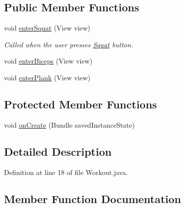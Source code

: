 \subsection*{Public Member Functions}
\begin{DoxyCompactItemize}
\item 
void \mbox{\hyperlink{classcom_1_1example_1_1trainawearapplication_1_1_workout_a5920ce94b756559297e72c55d7840590}{enter\+Squat}} (View view)
\begin{DoxyCompactList}\small\item\em Called when the user presses \mbox{\hyperlink{classcom_1_1example_1_1trainawearapplication_1_1_squat}{Squat}} button. \end{DoxyCompactList}\item 
void \mbox{\hyperlink{classcom_1_1example_1_1trainawearapplication_1_1_workout_a394e2b083ee2f81e83d424a1054b8724}{enter\+Biceps}} (View view)
\item 
void \mbox{\hyperlink{classcom_1_1example_1_1trainawearapplication_1_1_workout_a1f31842be78a46953f64aa6615b1dc93}{enter\+Plank}} (View view)
\end{DoxyCompactItemize}
\subsection*{Protected Member Functions}
\begin{DoxyCompactItemize}
\item 
void \mbox{\hyperlink{classcom_1_1example_1_1trainawearapplication_1_1_workout_a1a8beb733b991b8fc2b0844d77b2caa6}{on\+Create}} (Bundle saved\+Instance\+State)
\end{DoxyCompactItemize}


\subsection{Detailed Description}


Definition at line 18 of file Workout.\+java.



\subsection{Member Function Documentation}
\mbox{\label{classcom_1_1example_1_1trainawearapplication_1_1_workout_a394e2b083ee2f81e83d424a1054b8724}} 
